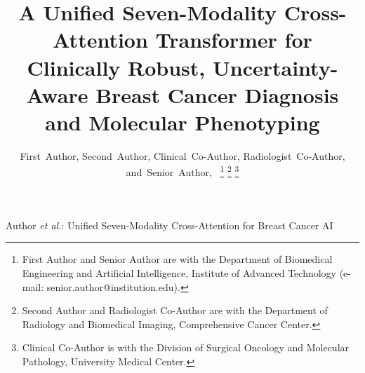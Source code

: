 \documentclass[11pt,journal,compsoc]{IEEEtran}
\begin{document}
\title{A Unified Seven-Modality Cross-Attention Transformer for Clinically Robust, Uncertainty-Aware Breast Cancer Diagnosis and Molecular Phenotyping}

\author{First~Author,
        Second~Author,
        Clinical~Co-Author,
        Radiologist~Co-Author,
        and~Senior~Author,~%
\thanks{First Author and Senior Author are with the Department of Biomedical Engineering and Artificial Intelligence, Institute of Advanced Technology (e-mail: senior.author@institution.edu).}%
\thanks{Second Author and Radiologist Co-Author are with the Department of Radiology and Biomedical Imaging, Comprehensive Cancer Center.}%
\thanks{Clinical Co-Author is with the Division of Surgical Oncology and Molecular Pathology, University Medical Center.}%
}

%
{Author \MakeLowercase{\textit{et al.}}: Unified Seven-Modality Cross-Attention for Breast Cancer AI}
\end{document}
